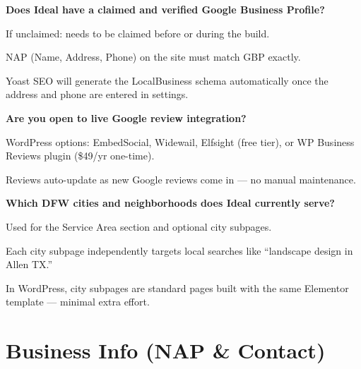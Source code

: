 \documentclass[11pt, letterpaper]{article}
\begin{document}
\begin{checklist}
  \item \textbf{Does Ideal have a claimed and verified Google Business Profile?}
    \begin{checklist}
      \item If unclaimed: needs to be claimed before or during the build.
      \item NAP (Name, Address, Phone) on the site must match GBP exactly.
      \item Yoast SEO will generate the LocalBusiness schema automatically
            once the address and phone are entered in settings.
    \end{checklist}

  \item \textbf{Are you open to live Google review integration?}
    \begin{checklist}
      \item WordPress options: EmbedSocial, Widewail, Elfsight (free tier),
            or WP Business Reviews plugin (\$49/yr one-time).
      \item Reviews auto-update as new Google reviews come in --- no manual
            maintenance.
    \end{checklist}

  \item \textbf{Which DFW cities and neighborhoods does Ideal currently serve?}
    \begin{checklist}
      \item Used for the Service Area section and optional city subpages.
      \item Each city subpage independently targets local searches like
            ``landscape design in Allen TX.''
      \item In WordPress, city subpages are standard pages built with the
            same Elementor template --- minimal extra effort.
    \end{checklist}
\end{checklist}

\section{Business Info (NAP \& Contact)}
\end{document}

